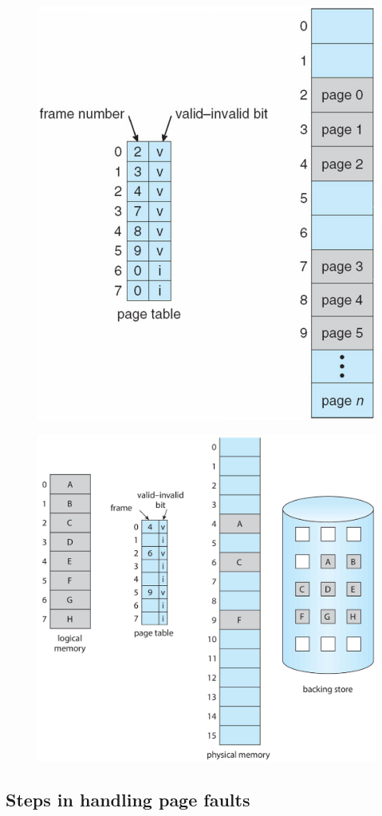 \begin{figure}[htbp]
    \centering
    \includegraphics[width=0.5\linewidth]{img/rfynhmg.png}
\end{figure}





\begin{figure}[htbp]
    \centering
    \includegraphics[width=0.5\linewidth]{img/mhg.png}
\end{figure}



\subsection{Steps in handling page faults}


